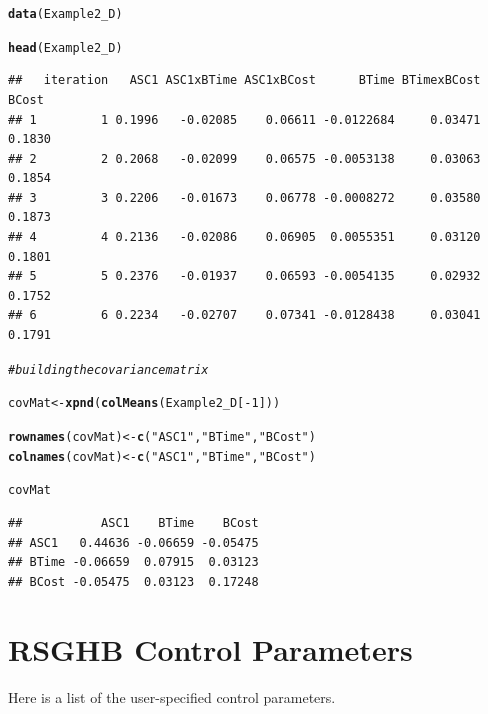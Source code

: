\documentclass{article}\usepackage[]{graphicx}\usepackage[]{color}
\makeatletter
\newcommand{\hlnum}[1]{\textcolor[rgb]{0.686,0.059,0.569}{#1}}%
\newcommand{\hlstr}[1]{\textcolor[rgb]{0.192,0.494,0.8}{#1}}%
\newcommand{\hlcom}[1]{\textcolor[rgb]{0.678,0.584,0.686}{\textit{#1}}}%
\newcommand{\hlopt}[1]{\textcolor[rgb]{0,0,0}{#1}}%
\newcommand{\hlstd}[1]{\textcolor[rgb]{0.345,0.345,0.345}{#1}}%
\newcommand{\hlkwb}[1]{\textcolor[rgb]{0.69,0.353,0.396}{#1}}%
\newcommand{\hlkwd}[1]{\textcolor[rgb]{0.737,0.353,0.396}{\textbf{#1}}}%
\newenvironment{kframe}{%
 \def\at@end@of@kframe{}%
 \ifinner\ifhmode%
  \def\at@end@of@kframe{\end{minipage}}%
  \begin{minipage}{\columnwidth}%
 \fi\fi%
 \def\FrameCommand##1{\hskip\@totalleftmargin \hskip-\fboxsep
 \colorbox{shadecolor}{##1}\hskip-\fboxsep
     \hskip-\linewidth \hskip-\@totalleftmargin \hskip\columnwidth}%
 \MakeFramed {\advance\hsize-\width
   \@totalleftmargin\z@ \linewidth\hsize
   \@setminipage}}%
 {\par\unskip\endMakeFramed%
 \at@end@of@kframe}
\newenvironment{knitrout}{}{} %
\makeatother
\begin{document}
\begin{knitrout}
\color{fgcolor}\begin{kframe}
\begin{alltt}
\hlkwd{data}\hlstd{(Example2_D)}

\hlkwd{head}\hlstd{(Example2_D)}
\end{alltt}
\begin{verbatim}
##   iteration   ASC1 ASC1xBTime ASC1xBCost      BTime BTimexBCost  BCost
## 1         1 0.1996   -0.02085    0.06611 -0.0122684     0.03471 0.1830
## 2         2 0.2068   -0.02099    0.06575 -0.0053138     0.03063 0.1854
## 3         3 0.2206   -0.01673    0.06778 -0.0008272     0.03580 0.1873
## 4         4 0.2136   -0.02086    0.06905  0.0055351     0.03120 0.1801
## 5         5 0.2376   -0.01937    0.06593 -0.0054135     0.02932 0.1752
## 6         6 0.2234   -0.02707    0.07341 -0.0128438     0.03041 0.1791
\end{verbatim}
\begin{alltt}
\hlcom{# building the covariance matrix}

\hlstd{covMat} \hlkwb{<-} \hlkwd{xpnd}\hlstd{(}\hlkwd{colMeans}\hlstd{(Example2_D[}\hlopt{-}\hlnum{1}\hlstd{]))}

\hlkwd{rownames}\hlstd{(covMat)} \hlkwb{<-} \hlkwd{c}\hlstd{(}\hlstr{"ASC1"}\hlstd{,} \hlstr{"BTime"}\hlstd{,} \hlstr{"BCost"}\hlstd{)}
\hlkwd{colnames}\hlstd{(covMat)} \hlkwb{<-} \hlkwd{c}\hlstd{(}\hlstr{"ASC1"}\hlstd{,} \hlstr{"BTime"}\hlstd{,} \hlstr{"BCost"}\hlstd{)}

\hlstd{covMat}
\end{alltt}
\begin{verbatim}
##           ASC1    BTime    BCost
## ASC1   0.44636 -0.06659 -0.05475
## BTime -0.06659  0.07915  0.03123
## BCost -0.05475  0.03123  0.17248
\end{verbatim}
\end{kframe}
\end{knitrout}


\section*{RSGHB Control Parameters}

Here is a list of the user-specified control parameters.
\end{document}
